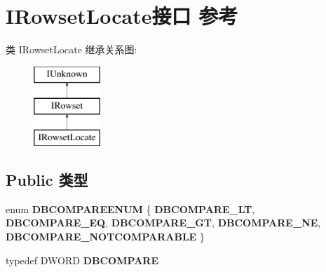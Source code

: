 \hypertarget{interface_i_rowset_locate}{}\section{I\+Rowset\+Locate接口 参考}
\label{interface_i_rowset_locate}
类 I\+Rowset\+Locate 继承关系图\+:\begin{figure}[H]
\begin{center}
\leavevmode
\includegraphics[height=3.000000cm]{interface_i_rowset_locate}
\end{center}
\end{figure}
\subsection*{Public 类型}
\begin{DoxyCompactItemize}
\item 
\mbox{\label{interface_i_rowset_locate_ae259661be8898a64db99d30ff874bd97}} 
enum {\bfseries D\+B\+C\+O\+M\+P\+A\+R\+E\+E\+N\+UM} \{ \newline
{\bfseries D\+B\+C\+O\+M\+P\+A\+R\+E\+\_\+\+LT}, 
{\bfseries D\+B\+C\+O\+M\+P\+A\+R\+E\+\_\+\+EQ}, 
{\bfseries D\+B\+C\+O\+M\+P\+A\+R\+E\+\_\+\+GT}, 
{\bfseries D\+B\+C\+O\+M\+P\+A\+R\+E\+\_\+\+NE}, 
\newline
{\bfseries D\+B\+C\+O\+M\+P\+A\+R\+E\+\_\+\+N\+O\+T\+C\+O\+M\+P\+A\+R\+A\+B\+LE}
 \}
\item 
\mbox{\label{interface_i_rowset_locate_a25046b359d7551fc4d60376432cc968d}} 
typedef D\+W\+O\+RD {\bfseries D\+B\+C\+O\+M\+P\+A\+RE}
\end{DoxyCompactItemize}
